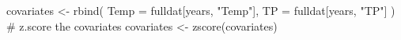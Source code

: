 \begin{Schunk}
\begin{Sinput}
 covariates <- rbind(
   Temp = fulldat[years, "Temp"],
   TP = fulldat[years, "TP"]
 )
 # z.score the covariates
 covariates <- zscore(covariates)
\end{Sinput}
\end{Schunk}
